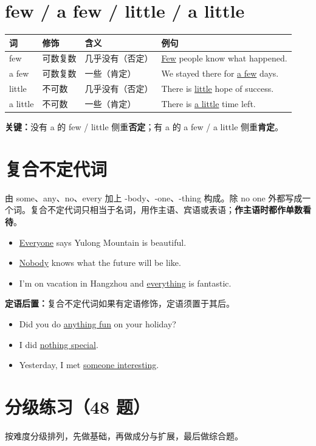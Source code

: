 \documentclass[11pt,a4paper]{ctexart}
\begin{document}
\section{few / a few / little / a little}
\begin{center}
\begin{tabular}{p{2.6cm}p{2.8cm}p{3.6cm}p{4.4cm}}
\hline
\textbf{词} & \textbf{修饰} & \textbf{含义} & \textbf{例句}\\
\hline
few & 可数复数 & 几乎没有（否定） & \underline{Few} people know what happened.\\
a few & 可数复数 & 一些（肯定） & We stayed there for \underline{a few} days.\\
little & 不可数 & 几乎没有（否定） & There is \underline{little} hope of success.\\
a little & 不可数 & 一些（肯定） & There is \underline{a little} time left.\\
\hline
\end{tabular}
\end{center}
\textbf{关键：}没有 a 的 few / little 侧重\textbf{否定}；有 a 的 a few / a little 侧重\textbf{肯定}。

\section{复合不定代词}
由 some、any、no、every 加上 -body、-one、-thing 构成。除 no one 外都写成一个词。复合不定代词只相当于名词，用作主语、宾语或表语；\textbf{作主语时都作单数看待}。
\begin{itemize}[leftmargin=1.4em]
\item \underline{Everyone} says Yulong Mountain is beautiful.
\item \underline{Nobody} knows what the future will be like.
\item I'm on vacation in Hangzhou and \underline{everything} is fantastic.
\end{itemize}
\textbf{定语后置：}复合不定代词如果有定语修饰，定语须置于其后。
\begin{itemize}[leftmargin=1.4em]
\item Did you do \underline{anything fun} on your holiday?
\item I did \underline{nothing special}.
\item Yesterday, I met \underline{someone interesting}.
\end{itemize}


\newpage
\section{分级练习（48 题）}
\noindent 按难度分级排列，先做基础，再做成分与扩展，最后做综合题。
\end{document}

